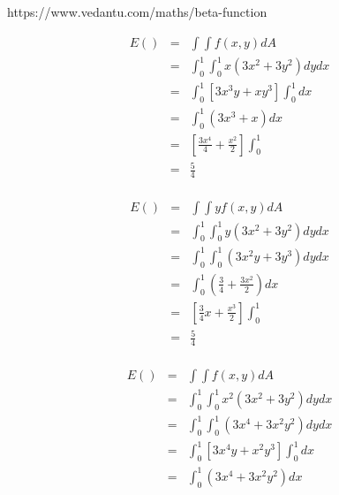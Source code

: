 



https://www.vedantu.com/maths/beta-function



\large


\begin{eqnarray*}
E() &=& \int\int f(x,y)dA \\
&=& \int^{1}_{0}\int^{1}_{0} x(3x^2 + 3y^2)dydx\\
&=& \int^{1}_{0}\left[ 3x^3y+xy^3 \right]\int^{1}_{0}dx\\
&=& \int^{1}_{0}\left( 3x^3+x \right)dx\\
&=& \left[\frac{3x^4}{4}+\frac{x^2}{2}\right]\int^{1}_{0}\\
&=& \frac{5}{4}\\
\end{eqnarray*}

\begin{eqnarray*}
E() &=& \int\int y f(x,y)dA \\
&=& \int^{1}_{0}\int^{1}_{0} y (3x^2 + 3y^2)dydx\\
&=& \int^{1}_{0}\int^{1}_{0} (3x^2y + 3y^3)dydx\\
&=& \int^{1}_{0} \left( \frac{3}{4}+\frac{3x^2}{2}\right) dx \\
&=& \left[\frac{3}{4}x +\frac{x^3}{2}\right]\int^{1}_{0}\\
&=& \frac{5}{4}\\
\end{eqnarray*}


\begin{eqnarray*}
E() &=& \int\int f(x,y)dA \\
&=& \int^{1}_{0}\int^{1}_{0} x^2(3x^2 + 3y^2)dydx\\
&=& \int^{1}_{0}\int^{1}_{0} (3x^4 + 3x^2y^2)dydx\\
&=& \int^{1}_{0}\left[3x^4y+x^2y^3\right]\int^{1}_{0}dx\\
&=&\int^{1}_{0} (3x^4 + 3x^2y^2)dx\\
\end{eqnarray*}



